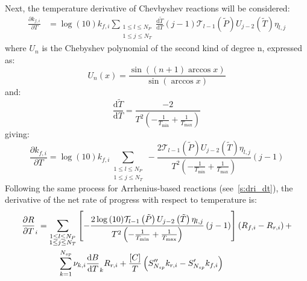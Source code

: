 \documentclass[12pt]{article}
\newcommand{\ns}{N_{sp}}
\begin{document}
Next, the temperature derivative of Chevbyshev reactions will be considered:
\begin{align}
 \frac{\partial {k_{f, i}} }{\partial T } &= \log{\left (10 \right )} {k_{f, i}} \sum_{\substack{1 \leq l \leq N_{P}\\1 \leq j \leq N_{T}}} \frac{\text{d} \tilde{T} }{\text{d} T } \left(j - 1\right) \mathcal{T}_{l - 1}\left(\tilde{P}\right) U_{j - 2}\left(\tilde{T}\right) \eta_{l,j}
\end{align}
where $U_n$ is the Chebyshev polynomial of the second kind of degree n, expressed as:
\begin{equation}
 U_n \left(x\right) = \frac{\sin\left(\left(n + 1\right) \arccos x\right)}{\sin \left(\arccos x \right)}
\end{equation}
and:
\begin{equation}
 \frac{\text{d} \tilde{T}}{\text{d} T} = \frac{-2}{T^2 \left(-\frac{1}{T_{\min}} + \frac{1}{T_{\text{max}}}\right)}
\end{equation}
giving:
\begin{equation}
 \frac{\partial {k_{f, i}} }{\partial T } = \log{\left (10 \right )} {k_{f, i}} \sum_{\substack{1 \leq l \leq N_{P}\\1 \leq j \leq N_{T}}} - \frac{2 \mathcal{T}_{l - 1}\left(\tilde{P}\right) U_{j - 2}\left(\tilde{T}\right) \eta_{l,j}}{T^{2} \left(- \frac{1}{T_{\min}} + \frac{1}{T_{\max}}\right)} \left(j - 1\right)
\end{equation}
Following the same process for Arrhenius-based reactions (see~\cref{s:dri_dt}), the derivative of the net rate of progress with respect to temperature is:
\begin{align}
 \frac{\partial R }{\partial T }_{i} &= \sum_{\substack{1 \leq l \leq N_{P}\\1 \leq j \leq N_{T}}} \left[ - \frac{2 \log{\left (10 \right )} \mathcal{T}_{l - 1}\left(\tilde{P}\right) U_{j - 2}\left(\tilde{T}\right) \eta_{l,j}}{T^{2} \left(- \frac{1}{T_{\min}} + \frac{1}{T_{\max}}\right)} \left(j - 1\right) \right] \left({R_{f, i}} - {R_{r, i}}\right) + \nonumber \\
				     & \mathindent \sum_{k=1}^{\ns} \nu_{k,i} \frac{\text{d} B }{\text{d} T }_{k} {R_{r, i}} + \frac{[C]}{T} \left(S^{\prime\prime}_{\ns} {k_{r, i}} - S^{\prime}_{\ns} {k_{f, i}}\right)
\end{align}
\end{document}
